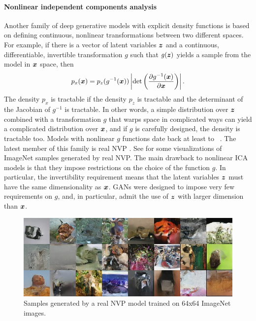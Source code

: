 \paragraph{Nonlinear independent components analysis}
Another family of deep generative models with explicit density functions is based on
defining continuous, nonlinear transformations between two different spaces.
For example, if there is a vector of latent variables ${\bm{z}}$ and a continuous, differentiable,
invertible transformation
$g$ such that $g({\bm{z}})$ yields a sample from the model in ${\bm{x}}$ space,
then
\begin{equation}
  \label{eq:change-of-variable}
  p_x({\bm{x}}) = p_z(g^{-1}({\bm{x}})) \left| \mathrm{det}
  \left( \frac{\partial g^{-1}({\bm{x}})} {\partial {\bm{x}}}\right) \right|. 
\end{equation}
The density $p_x$ is tractable if the density $p_z$ is tractable
and the determinant of the Jacobian of $g^{-1}$ is tractable.
In other words, a simple distribution over ${\bm{z}}$ combined with
a transformation $g$ that warps space in complicated ways can yield
a complicated distribution over ${\bm{x}}$, and if $g$ is carefully designed,
the density is tractable too.
Models with nonlinear $g$ functions date back at least to
~\citet{hyvarinen1999nonlinear}.
The latest member of this family is real NVP \citep{dinh2016density}.
See  for some visualizations of ImageNet samples
generated by real NVP.
The main drawback to nonlinear ICA models is that they impose restrictions
on the choice of the function $g$. In particular, the invertibility requirement
means that the latent variables ${\bm{z}}$ must have the same dimensionality as ${\bm{x}}$.
GANs were designed to impose very few requirements on $g$, and, in particular,
admit the use of ${\bm{z}}$ with larger dimension than ${\bm{x}}$.

\begin{figure}
\centering
\includegraphics[width=\textwidth]{fig_imnet_64_samples}
\caption{Samples generated by a real NVP model trained on 64x64 ImageNet images.}
\label{fig:nvp}
\end{figure}

